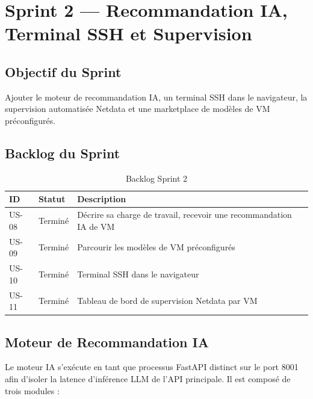 \section{Sprint 2 --- Recommandation IA, Terminal SSH et Supervision}

\subsection{Objectif du Sprint}

Ajouter le moteur de recommandation IA, un terminal SSH dans le navigateur, la
supervision automatisée Netdata et une marketplace de modèles de VM préconfigurés.

\subsection{Backlog du Sprint}

\begin{table}[H]
\centering
\caption{Backlog Sprint 2}
\label{tab:sprint2_backlog}
\begin{tabularx}{\linewidth}{llX}
\toprule
\textbf{ID} & \textbf{Statut} & \textbf{Description} \\
\midrule
US-08 & Terminé & Décrire sa charge de travail, recevoir une recommandation IA de VM \\
US-09 & Terminé & Parcourir les modèles de VM préconfigurés \\
US-10 & Terminé & Terminal SSH dans le navigateur \\
US-11 & Terminé & Tableau de bord de supervision Netdata par VM \\
\bottomrule
\end{tabularx}
\end{table}

\subsection{Moteur de Recommandation IA}

Le moteur IA s'exécute en tant que processus FastAPI distinct sur le port 8001 afin
d'isoler la latence d'inférence LLM de l'API principale. Il est composé de trois
modules :

